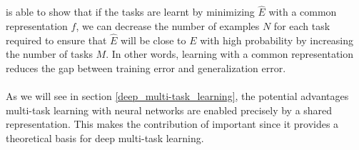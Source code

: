 \\\\
\citet{baxter1995} is able to show that if the tasks are learnt by minimizing $\hat{E}$ with a common representation $f$, we can decrease the number of examples $N$ for each task required to ensure that $\hat{E}$ will be close to $E$ with high probability by increasing the number of tasks $M$. In other words, learning with a common representation reduces the gap between training error and generalization error.
\\\\
As we will see in section \ref{deep_multi-task_learning}, the potential advantages multi-task learning with neural networks are enabled precisely by a shared representation. This makes the contribution of \citet{baxter1995} important since it provides a theoretical basis for deep multi-task learning.
